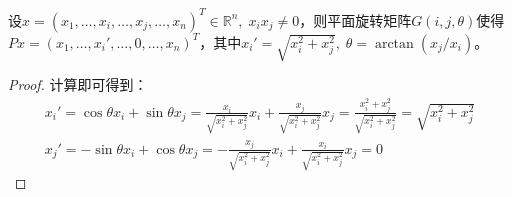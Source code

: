 \begin{theorem}[G约化定理]\label{theo:Givens}
	设$x=(x_1,\dots,x_i,\dots,x_j,\dots,x_n)^T\in\mathbb{R}^{n},\;x_ix_j\ne0$，则平面旋转矩阵$G(i,j,\theta)$使得$Px=(x_1,\dots,x_i',\dots,0,\dots,x_n)^T$，其中$x_i'=\sqrt{x_i^2+x_j^2},\;\theta=\arctan(x_j/x_i)$。
\end{theorem}
\begin{proof}
	计算即可得到：
	\begin{gather*}
		x_i'=\cos\theta x_i+\sin\theta x_j=\frac{x_i}{\sqrt{x_i^2+x_j^2}}x_i+\frac{x_j}{\sqrt{x_i^2+x_j^2}}x_j=\frac{x_i^2+x_j^2}{\sqrt{x_i^2+x_j^2}}=\sqrt{x_i^2+x_j^2} \\
		x_j'=-\sin\theta x_i+\cos\theta x_j=-\frac{x_j}{\sqrt{x_i^2+x_j^2}}x_i+\frac{x_i}{\sqrt{x_i^2+x_j^2}}x_j=0
	\end{gather*}
\end{proof}

